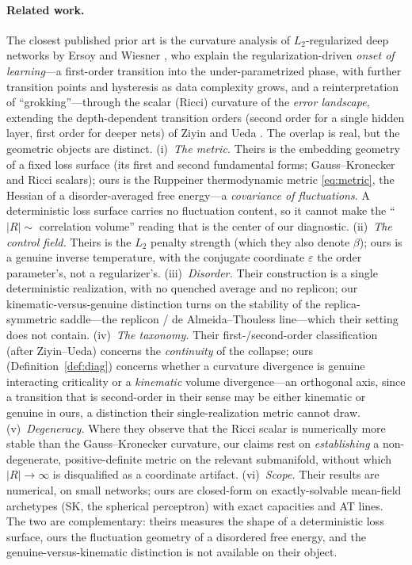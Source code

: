 \documentclass[a4paper,11pt]{article}
\theoremstyle{plain}
\theoremstyle{definition}
\theoremstyle{remark}
\newcommand{\Ric}{R}
\newcommand{\eps}{\varepsilon}
\begin{document}
\paragraph{Related work.} The closest published prior art is the curvature analysis of $L_2$-regularized
deep networks by Ersoy and Wiesner \cite{ersoy2025}, who explain the regularization-driven \emph{onset of
learning}---a first-order transition into the under-parametrized phase, with further transition points and
hysteresis as data complexity grows, and a reinterpretation of ``grokking''---through the scalar (Ricci)
curvature of the \emph{error landscape}, extending the depth-dependent transition orders (second order for a
single hidden layer, first order for deeper nets) of Ziyin and Ueda \cite{ziyinueda2023}. The overlap is
real, but the geometric objects are distinct. (i)~\emph{The metric.} Theirs is the embedding geometry of a
fixed loss surface (its first and second fundamental forms; Gauss--Kronecker and Ricci scalars); ours is the
Ruppeiner thermodynamic metric \eqref{eq:metric}, the Hessian of a disorder-averaged free energy---a
\emph{covariance of fluctuations}. A deterministic loss surface carries no fluctuation content, so it cannot
make the ``$|\Ric|\sim$ correlation volume'' reading that is the center of our diagnostic. (ii)~\emph{The
control field.} Theirs is the $L_2$ penalty strength (which they also denote $\beta$); ours is a genuine
inverse temperature, with the conjugate coordinate $\eps$ the order parameter's, not a regularizer's.
(iii)~\emph{Disorder.} Their construction is a single deterministic realization, with no quenched average and
no replicon; our kinematic-versus-genuine distinction turns on the stability of the replica-symmetric
saddle---the replicon / de Almeida--Thouless line---which their setting does not contain. (iv)~\emph{The
taxonomy.} Their first-/second-order classification (after Ziyin--Ueda) concerns the \emph{continuity} of the
collapse; ours (Definition~\ref{def:diag}) concerns whether a curvature divergence is genuine interacting
criticality or a \emph{kinematic} volume divergence---an orthogonal axis, since a transition that is
second-order in their sense may be either kinematic or genuine in ours, a distinction their single-realization
metric cannot draw. (v)~\emph{Degeneracy.} Where they observe that the Ricci scalar is numerically more
stable than the Gauss--Kronecker curvature, our claims rest on \emph{establishing} a non-degenerate,
positive-definite metric on the relevant submanifold, without which $|\Ric|\to\infty$ is disqualified as a
coordinate artifact. (vi)~\emph{Scope.} Their results are numerical, on small networks; ours are closed-form
on exactly-solvable mean-field archetypes (SK, the spherical perceptron) with exact capacities and AT lines.
The two are complementary: theirs measures the shape of a deterministic loss surface, ours the fluctuation
geometry of a disordered free energy, and the genuine-versus-kinematic distinction is not available on their
object.
\end{document}
